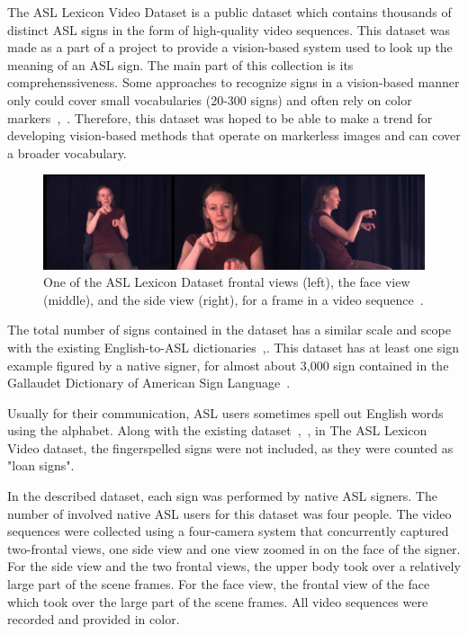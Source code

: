 The ASL Lexicon Video Dataset is a public dataset which contains thousands of distinct ASL signs in the form of high-quality video sequences. This dataset was made as a part of a project to provide a vision-based system used to look up the meaning of an ASL sign. The main part of this collection is its comprehenssiveness. Some approaches to recognize signs in a vision-based manner only could cover small vocabularies (20-300 signs) and often rely on color markers~\cite{vision1},~\cite{vision2}. Therefore, this dataset was hoped to be able to make a trend for developing vision-based methods that operate on markerless images and can cover a broader vocabulary.

\begin{figure}[H]
	\begin{center}
		\includegraphics[width=1.0\textwidth]{figures/asl_4_side.png}
		\caption{One of the ASL Lexicon Dataset frontal views (left), the face view (middle), and the side view (right), for a frame in a video sequence~\cite{ASLLexiconVideoDataset}.} 
		\label{fig:1_ASLView}
	\end{center}
\end{figure}

The total number of signs contained in the dataset has a similar scale and scope with the existing English-to-ASL dictionaries~\cite{gallaudetBook1},\cite{gallaudetBook2}. This dataset has at least one sign example figured by a native signer, for almost about 3,000 sign contained in the Gallaudet Dictionary of American Sign Language~\cite{gallaudetBook2}.

Usually for their communication, ASL users sometimes spell out English words using the alphabet. Along with the existing dataset~\cite{gallaudetBook1},~\cite{gallaudetBook2}, in The ASL Lexicon Video dataset, the fingerspelled signs were not included, as they were counted as "loan signs".

In the described dataset, each sign was performed by native ASL signers. The number of involved native ASL users for this dataset was four people. The video sequences were collected using a four-camera system that concurrently captured two-frontal views, one side view and one view zoomed in on the face of the signer. For the side view and the two frontal views, the upper body took over a relatively large part of the scene frames. For the face view, the frontal view of the face which took over the large part of the scene frames. All video sequences were recorded and provided in color.


